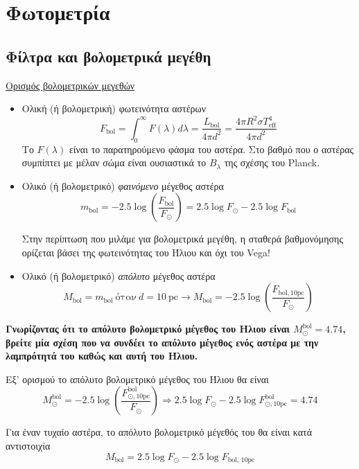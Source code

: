 \chapter{Φωτομετρία}
\label{ch:Chapter3}

\section{Φίλτρα και βολομετρικά μεγέθη}

\underline{Ορισμός βολομετρικών μεγεθών}

\begin{itemize}
    \item Ολική (ή βολομετρική) φωτεινότητα αστέρων 
    $$F_{\text{bol}} = \int_0^{\infty}F(\lambda) d\lambda = \frac{L_{\text{bol}}}{4 \pi d^2} = \frac{4\pi R^2 \sigma T_{\text{eff}}^4}{4\pi d^2}$$
    Το $F(\lambda)$ είναι το παρατηρούμενο φάσμα του αστέρα. Στο βαθμό που ο αστέρας συμπίπτει με μέλαν σώμα είναι ουσιαστικά το $B_{\lambda}$ της σχέσης του Planck.
    \item Ολικό (ή βολομετρικό) \textit{φαινόμενο} μέγεθος αστέρα 
    $$m_{\text{bol}} = -2.5 \log \left( \frac{F_{\text{bol}}}{F_{\odot}} \right) = 2.5 \log F_{\odot} - 2.5 \log F_{\text{bol}}$$
    
    {\color{red} Στην περίπτωση που μιλάμε για βολομετρικά μεγέθη, η σταθερά βαθμονόμησης ορίζεται βάσει της φωτεινότητας του Ήλιου και όχι του Vega!}
    \item Ολικό (ή βολομετρικό) \textit{απόλυτο} μέγεθος αστέρα
    $$M_{\text{bol}} = m_{\text{bol}} \ \text{όταν} \ d = 10 \ \text{pc} \longrightarrow M_{\text{bol}} = -2.5 \log \left( \frac{F_{\text{bol}, 10 \text{pc}}}{F_{\odot}} \right)$$
\end{itemize}

\textbf{Γνωρίζοντας ότι το απόλυτο βολομετρικό μέγεθος του Ήλιου είναι $M_{\odot}^{\text{bol}} = 4.74$, βρείτε μία σχέση που να συνδέει το απόλυτο μέγεθος ενός αστέρα με την λαμπρότητά του καθώς και αυτή του Ήλιου.}

Εξ' ορισμού το απόλυτο βολομετρικό μέγεθος του Ήλιου θα είναι
$$M_{\odot}^{\text{bol}} = -2.5 \log \left( \frac{F_{\odot, \text{10pc}}^{\text{bol}}}{F_{\odot}} \right) \Rightarrow 2.5 \log F_{\odot} - 2.5 \log F_{\odot, \text{10pc}}^{\text{bol}} = 4.74 $$

Για έναν τυχαίο αστέρα, το απόλυτο βολομετρικό μέγεθός του θα είναι κατά αντιστοιχία
$$M_{\text{bol}} = 2.5 \log F_{\odot} - 2.5 \log F_{\text{bol, 10pc}}$$

